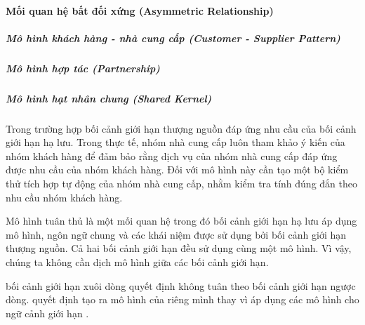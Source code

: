 \documentclass{article} %
\begin{document}
% 
%
%
%
%

\paragraph{Mối quan hệ bất đối xứng (Asymmetric Relationship)}











 







\subparagraph{Mô hình khách hàng - nhà cung cấp (Customer - Supplier Pattern)}

% 

\subparagraph{Mô hình hợp tác (Partnership)}

% 

\subparagraph{Mô hình hạt nhân chung (Shared Kernel)}

% 
% 



Trong trường hợp bối cảnh giới hạn thượng nguồn đáp ứng nhu cầu của bối cảnh giới hạn hạ lưu.
Trong thực tế, nhóm nhà cung cấp luôn tham khảo ý kiến ​​của nhóm khách hàng để đảm bảo rằng dịch vụ của nhóm nhà cung cấp đáp ứng được nhu cầu của nhóm khách hàng.
Đối với mô hình này cần tạo một bộ kiểm thử tích hợp tự động của nhóm nhà cung cấp, nhằm kiểm tra tính đúng đắn theo nhu cầu nhóm khách hàng.


Mô hình tuân thủ là một mối quan hệ trong đó bối cảnh giới hạn hạ lưu áp dụng mô hình, ngôn ngữ chung và các khái niệm được sử dụng bởi bối cảnh giới hạn thượng nguồn.
Cả hai bối cảnh giới hạn đều sử dụng cùng một mô hình. Vì vậy, chúng ta không cần dịch mô hình giữa các bối cảnh giới hạn.


bối cảnh giới hạn xuôi dòng quyết định không tuân theo bối cảnh giới hạn ngược dòng.
quyết định tạo ra mô hình của riêng mình thay vì áp dụng các mô hình cho ngữ cảnh giới hạn .
\end{document}
